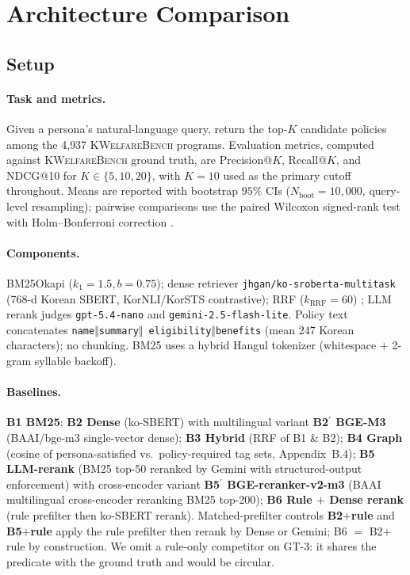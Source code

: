 \documentclass{article}
\newcommand{\kwbench}{\textsc{KWelfareBench}}
\newcommand{\npolicy}{4{,}937}
\begin{document}
\section{Architecture Comparison}
\label{sec:exp}

\subsection{Setup}
\label{sec:exp:setup}

\paragraph{Task and metrics.}
Given a persona's natural-language query, return the top-$K$
candidate policies among the \npolicy{} \kwbench{} programs.
Evaluation metrics, computed against \kwbench{} ground truth, are
Precision@$K$, Recall@$K$, and NDCG@10 for $K\in\{5,10,20\}$, with
$K{=}10$ used as the primary cutoff throughout. Means are
reported with bootstrap $95\%$ CIs ($N_{\mathrm{boot}}{=}10{,}000$,
query-level resampling); pairwise comparisons use the paired Wilcoxon
signed-rank test \citep{wilcoxon1945signed} with Holm--Bonferroni
correction \citep{holm1979bonferroni}.

\paragraph{Components.}
BM25Okapi \citep{robertson2009bm25,trotman2014bm25vskl}
($k_1{=}1.5,b{=}0.75$); dense retriever
\texttt{jhgan/ko-sroberta-multitask} \citep{park2023kosroberta,reimers2019sbert}
(768-d Korean SBERT, KorNLI/KorSTS contrastive); RRF
($k_{\mathrm{RRF}}{=}60$) \citep{cormack2009rrf}; LLM rerank judges
\texttt{gpt-5.4-nano} and \texttt{gemini-2.5-flash-lite}.
Policy text concatenates \texttt{name$\Vert$summary$\Vert$
eligibility$\Vert$benefits} (mean 247 Korean characters); no
chunking. BM25 uses a hybrid Hangul tokenizer (whitespace $+$ 2-gram
syllable backoff).

\paragraph{Baselines.}
\textbf{B1 BM25}; \textbf{B2 Dense} (ko-SBERT) with multilingual
variant \textbf{B2$^\prime$ BGE-M3} (BAAI/bge-m3 single-vector dense);
\textbf{B3 Hybrid} (RRF of B1 \& B2);
\textbf{B4 Graph} (cosine of persona-satisfied vs.\ policy-required
tag sets, Appendix~B.4);
\textbf{B5 LLM-rerank} (BM25 top-50 reranked by Gemini with
structured-output enforcement) with cross-encoder variant
\textbf{B5$^\prime$ BGE-reranker-v2-m3} (BAAI multilingual
cross-encoder reranking BM25 top-200);
\textbf{B6 Rule $+$ Dense rerank} (rule prefilter then ko-SBERT
rerank). Matched-prefilter controls \textbf{B2$+$rule} and
\textbf{B5$+$rule} apply the rule prefilter then rerank by Dense or
Gemini; B6 $=$ B2$+$rule by construction. We omit a rule-only
competitor on GT-3: it shares the predicate with the ground truth
and would be circular.
\end{document}
